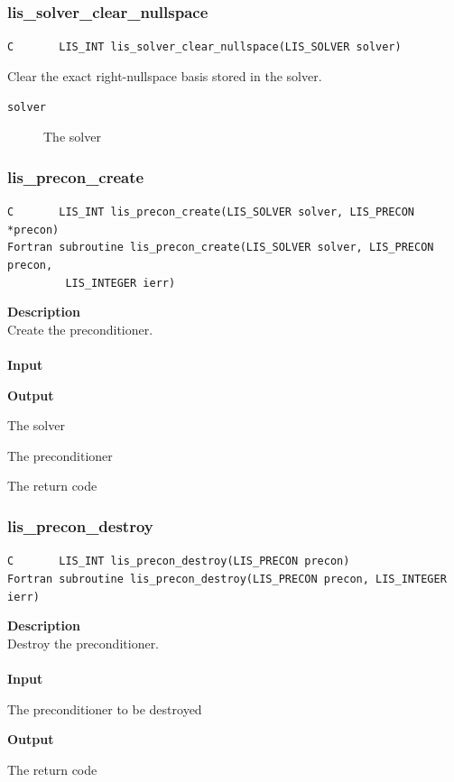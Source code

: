 \documentclass[a4paper]{article}
\newcommand{\namelistlabel}[1]{\mbox{#1}\hfill}
\newenvironment{namelist}[1]{%
\begin{list}{}
  {\let\makelabel\namelistlabel
  \settowidth{\labelwidth}{#1}
  \setlength{\leftmargin}{1.1\labelwidth}}
  }{%
\end{list}}
\begin{document}
\subsubsection{lis\_solver\_clear\_nullspace}

\verb|C       LIS_INT lis_solver_clear_nullspace(LIS_SOLVER solver)|

Clear the exact right-nullspace basis stored in the solver.

\begin{description}
\item[\tt solver] The solver
\end{description}

\subsubsection{lis\_precon\_create}
\begin{screen}
\verb|C       LIS_INT lis_precon_create(LIS_SOLVER solver, LIS_PRECON *precon)|\\
\verb|Fortran subroutine lis_precon_create(LIS_SOLVER solver, LIS_PRECON precon,|\\
\verb|         LIS_INTEGER ierr)|
\end{screen}
{\bf Description}\\
\indent
Create the preconditioner.
\\ \\
\noindent
{\bf Input}
\begin{namelist}{XXXXXXXXXXXXXXXXXXXX}
\item[None]
\end{namelist}
{\bf Output}
\begin{namelist}{XXXXXXXXXXXXXXXXXXXX}
\item[\tt solver] The solver
\item[\tt precon] The preconditioner
\item[\tt ierr] The return code
\end{namelist}

\subsubsection{lis\_precon\_destroy}
\begin{screen}
\verb|C       LIS_INT lis_precon_destroy(LIS_PRECON precon)|\\
\verb|Fortran subroutine lis_precon_destroy(LIS_PRECON precon, LIS_INTEGER ierr)|
\end{screen}
{\bf Description}\\
\indent
Destroy the preconditioner.
\\ \\
\noindent
{\bf Input}
\begin{namelist}{XXXXXXXXXXXXXXXXXXXX}
\item[\tt precon] The preconditioner to be destroyed
\end{namelist}
{\bf Output}
\begin{namelist}{XXXXXXXXXXXXXXXXXXXX}
\item[\tt ierr] The return code
\end{namelist}
\end{document}
